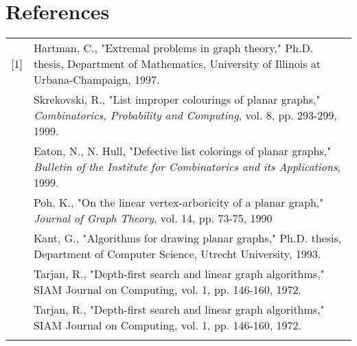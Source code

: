 \documentclass[11pt,letter]{article}
\begin{document}
\section*{References}

\begin{tabularx}{\linewidth}{lX}
[1] & Hartman, C., "Extremal problems in graph theory," Ph.D. thesis, Department of Mathematics,
University of Illinois at Urbana-Champaign, 1997.\\\relax
[2] & Skrekovski, R., "List improper colourings of planar graphs,"
\emph{Combinatorics, Probability and Computing}, vol. 8, pp. 293-299, 1999.\\\relax
[3] & Eaton, N., N. Hull, "Defective list colorings of planar graphs,"
\emph{Bulletin of the Institute for Combinatorics and its Applications}, 1999.\\\relax
[4] & Poh, K., "On the linear vertex-arboricity of a planar graph," \emph{Journal of Graph Theory},
vol. 14, pp. 73-75, 1990\\\relax
[5] & Kant, G., "Algorithms for drawing planar graphs," Ph.D. thesis, Department of Computer Science,
Utrecht University, 1993.\\\relax
[6] & Tarjan, R., "Depth-first search and linear graph algorithms," SIAM Journal on Computing, vol. 1, pp.
146-160, 1972.\\\relax
[6] & Tarjan, R., "Depth-first search and linear graph algorithms," SIAM Journal on Computing, vol. 1, pp.
146-160, 1972.\\\relax
\end{tabularx}
\end{document}
